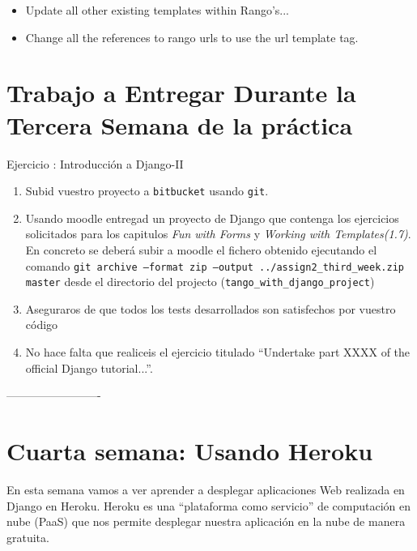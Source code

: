\documentclass[12pt]{article} %
\newcounter{ejercicioNo}
\begin{document}
\begin{itemize}
 \item Update all other existing templates within Rango’s...
 \item Change all the references to rango urls to use the url template tag.
\end{itemize}


\section{Trabajo a Entregar Durante la Tercera Semana de la práctica}

\begin{minipage}{\linewidth}
\begin{framed}
\addtocounter{ejercicioNo}{1} 
Ejercicio : Introducción a Django-II
\begin{enumerate}
\item Subid vuestro proyecto a \texttt{bitbucket} usando \texttt{git}. 

\item Usando moodle entregad un proyecto de Django que contenga los ejercicios solicitados para los capitulos \textit{Fun with Forms} y  \textit{Working with Templates(1.7)}. En concreto se deberá subir a moodle el fichero obtenido ejecutando el comando \texttt{git archive --format zip --output ../assign2\_third\_week.zip  master} desde el directorio del projecto (\texttt{tango\_with\_django\_project})

\item  Aseguraros de que todos los tests desarrollados son satisfechos por vuestro código
\item No hace falta que realiceis el ejercicio titulado ``Undertake part XXXX of the official Django tutorial...''. 

\end{enumerate}
\end{framed}
\end{minipage}
-------------------------

\section{Cuarta semana: Usando Heroku}
En esta semana vamos a ver aprender a desplegar aplicaciones Web realizada en Django en Heroku. Heroku es una ``plataforma como servicio'' de computación en nube (PaaS) que nos permite desplegar nuestra aplicación en la nube de manera gratuita.
\end{document}
